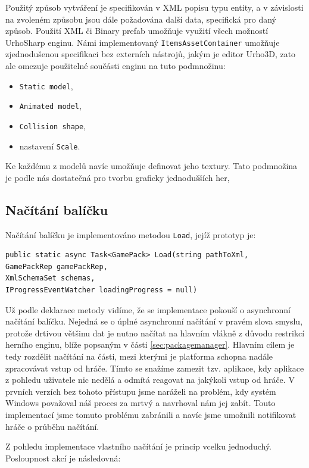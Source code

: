 Použitý způsob vytváření je specifikován v XML popisu typu entity, a v závislosti na zvoleném způsobu jsou dále požadována další data, specifická pro daný způsob. Použití XML či Binary prefab umožňuje využití všech možností UrhoSharp enginu. Námi implementovaný \texttt{ItemsAssetContainer} umožňuje zjednodušenou specifikaci bez externích nástrojů, jakým je editor Urho3D, zato ale omezuje použitelné součásti enginu na tuto podmnožinu:

\begin{itemize}
	\item \texttt{Static model},
	\item \texttt{Animated model},
	\item \texttt{Collision shape},
	\item nastavení \texttt{Scale}.
\end{itemize}

Ke každému z modelů navíc umožňuje definovat jeho textury. Tato podmnožina je podle nás dostatečná pro tvorbu graficky jednodušších her,

\subsection{Načítání balíčku}
\label{sec:packageloading}

Načítání balíčku je implementováno metodou \texttt{Load}, jejíž prototyp je:
\begin{lstlisting}
public static async Task<GamePack> Load(string pathToXml,
GamePackRep gamePackRep,
XmlSchemaSet schemas,
IProgressEventWatcher loadingProgress = null)
\end{lstlisting}

Už podle deklarace metody vidíme, že se implementace pokouší o asynchronní načítání balíčku. Nejedná se o úplné asynchronní načítání v pravém slova smyslu, protože drtivou většinu dat je nutno načítat na hlavním vlákně z důvodu restrikcí herního enginu, blíže popsaným v části \ref{sec:packagemanager}. Hlavním cílem je tedy rozdělit načítání na části, mezi kterými je platforma schopna nadále zpracovávat vstup od hráče. Tímto se snažíme zamezit tzv.  aplikace, kdy aplikace z pohledu uživatele nic nedělá a odmítá reagovat na jakýkoli vstup od hráče. V prvních verzích bez tohoto přístupu jsme naráželi na problém, kdy systém Windows považoval náš proces za mrtvý a navrhoval nám jej zabít. Touto implementací jsme tomuto problému zabránili a navíc jsme umožnili notifikovat hráče o průběhu načítání.

Z pohledu implementace vlastního načítání je princip vcelku jednoduchý. Posloupnost akcí je následovná:

